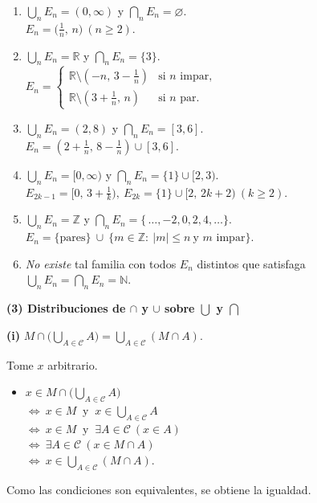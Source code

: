 \documentclass[12pt,letterpaper]{exam}
\begin{document}
\begin{questions}
\begin{enumerate}[label=\alph*)]
\item $\displaystyle\bigcup_{n}E_n=(0,\infty)$ y $\displaystyle\bigcap_{n}E_n=\varnothing$.\\
$E_n=\big(\tfrac1n,\,n\big)\ (n\ge2)$.

\item $\displaystyle\bigcup_{n}E_n=\mathbb R$ y $\displaystyle\bigcap_{n}E_n=\{3\}$.\\
\(
E_n=
\begin{cases}
\mathbb R\setminus(-n,\,3-\tfrac1n) & \text{si $n$ impar},\\
\mathbb R\setminus(3+\tfrac1n,\,n) & \text{si $n$ par}.
\end{cases}
\)

\item $\displaystyle\bigcup_{n}E_n=(2,8)$ y $\displaystyle\bigcap_{n}E_n=[3,6]$.\\
$E_n=(2+\tfrac1n,\,8-\tfrac1n)\cup[3,6]$.

\item $\displaystyle\bigcup_{n}E_n=[0,\infty)$ y $\displaystyle\bigcap_{n}E_n=\{1\}\cup[2,3)$.\\
$E_{2k-1}=[0,\,3+\tfrac1k),\ 
E_{2k}=\{1\}\cup[2,\,2k+2)\ (k\ge2)$.

\item $\displaystyle\bigcup_{n}E_n=\mathbb Z$ y $\displaystyle\bigcap_{n}E_n=\{\,\ldots,-2,0,2,4,\ldots\}$.\\
$E_n=\{\text{pares}\}\ \cup\ \{m\in\mathbb Z:\ |m|\le n\ \text{y $m$ impar}\}$.

\item \textit{No existe} tal familia con todos $E_n$ distintos que satisfaga
\(
\bigcup_{n}E_n=\bigcap_{n}E_n=\mathbb N.
\)
\end{enumerate}

\question \textbf{(3) Distribuciones de $\cap$ y $\cup$ sobre $\bigcup$ y $\bigcap$}

\textbf{(i)} \quad $
M \cap \Big( \displaystyle\bigcup_{A\in\mathcal C} A \Big)
= \displaystyle\bigcup_{A\in\mathcal C} (M \cap A).
$
\medskip

Tome $x$ arbitrario.
\begin{itemize}
  \item $x \in M \cap \Big(\displaystyle\bigcup_{A\in\mathcal C} A\Big)$\\[2pt]
  $\Leftrightarrow\ x \in M \ \text{ y }\ x \in \displaystyle\bigcup_{A\in\mathcal C} A$\\[2pt]
  $\Leftrightarrow\ x \in M \ \text{ y }\ \exists A \in \mathcal C \ (x \in A)$\\[2pt]
  $\Leftrightarrow\ \exists A \in \mathcal C \ (x \in M \cap A)$\\[2pt]
  $\Leftrightarrow\ x \in \displaystyle\bigcup_{A\in\mathcal C} (M \cap A)$.
\end{itemize}
Como las condiciones son equivalentes, se obtiene la igualdad.
\medskip


\end{questions}
\end{document}
